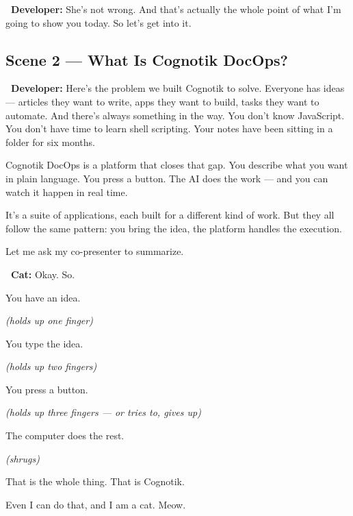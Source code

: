 \documentclass[12pt, letterpaper]{article}
\newcommand{\dev}{\textbf{\color{cogblue}\faIcon{laptop-code}\ Developer:}}
\newcommand{\cat}{\textbf{\color{catpink}\faIcon{cat}\ Cat:}}
\begin{document}
  \begin{developerbox}
    \dev{} She's not wrong. And that's actually the whole point of what I'm going
    to show you today. So let's get into it.
  \end{developerbox}

  \subsection{Scene 2 — What Is Cognotik DocOps?}

  \begin{developerbox}
    \dev{} Here's the problem we built Cognotik to solve. Everyone has ideas —
    articles they want to write, apps they want to build, tasks they want to
    automate. And there's always something in the way. You don't know JavaScript.
    You don't have time to learn shell scripting. Your notes have been sitting in
    a folder for six months.

    \medskip
    Cognotik DocOps is a platform that closes that gap. You describe what you want
    in plain language. You press a button. The AI does the work — and you can watch
    it happen in real time.

    \medskip
    It's a suite of applications, each built for a different kind of work. But they
    all follow the same pattern: you bring the idea, the platform handles the
    execution.

    \medskip
    Let me ask my co-presenter to summarize.
  \end{developerbox}

  \begin{catbox}
    \cat{} \large Okay. So.

    \medskip
    {\large You have an idea.}

    \medskip
    {\large\textit{(holds up one finger)}}

    \medskip
    {\large You type the idea.}

    \medskip
    {\large\textit{(holds up two fingers)}}

    \medskip
    {\large You press a button.}

    \medskip
    {\large\textit{(holds up three fingers — or tries to, gives up)}}

    \medskip
    {\large The computer does the rest.}

    \medskip
    {\large\textit{(shrugs)}}

    \medskip
    {\large That is the whole thing. That is Cognotik.}

    \medskip
    {\large Even I can do that, and I am a cat. Meow.}
  \end{catbox}
\end{document}
